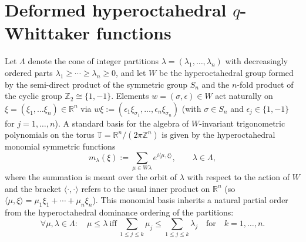 \documentclass[reqno]{amsart}
\theoremstyle{remark}
\numberwithin{equation}{section}
\begin{document}
 
 
 
\section{Deformed hyperoctahedral $q$-Whittaker functions}\label{sec3}
Let  $\Lambda$ denote the cone of integer partitions $\lambda=(\lambda_1,\ldots ,\lambda_n)$  with
decreasingly ordered parts $\lambda_1\geq\cdots\geq\lambda_n\geq 0$, and let
$W$ be the hyperoctahedral group formed by the semi-direct product of the symmetric group $S_n$ and the
$n$-fold product of the cyclic group $\mathbb{Z}_2\cong \{1,-1\}$. 
Elements $w=(\sigma,\epsilon)\in W$ act naturally on $\xi=(\xi_1,\ldots\xi_n)\in \mathbb{R}^n$ via $w\xi:=(\epsilon_1 \xi_{\sigma_1},\ldots ,\epsilon_n \xi_{\sigma_n})$ (with $\sigma\in S_n$ and $\epsilon_j\in \{1,-1\}$ for $j=1,\ldots ,n$).
A standard basis for
the algebra of $W$-invariant trigonometric polynomials on the torus $\mathbb{T}=\mathbb{R}^n/(2\pi\mathbb{Z}^n)$ is given by
the
hyperoctahedral monomial symmetric functions
\begin{equation}
m_\lambda(\xi):=\sum_{\mu\in W\lambda} e^{i\langle \mu ,\xi\rangle},\qquad \lambda\in\Lambda,
\end{equation}
where the summation is meant over the orbit of $\lambda$ with respect to the action of $W$ and the bracket $\langle\cdot ,\cdot \rangle$ refers to the usual inner product on $\mathbb{R}^n$ (so $\langle \mu ,\xi\rangle =\mu_1\xi_1+\cdots +\mu_n\xi_n$). This monomial basis inherits a natural partial order from the
hyperoctahedral dominance ordering of the partitions:
\begin{equation}\label{porder}
\forall \mu,\lambda\in\Lambda:\quad \mu\leq \lambda \ \text{iff}\
\sum_{1\leq j\leq k} \mu_j \leq \sum_{1\leq j\leq k} \lambda_j \quad\text{for}\quad k=1,\ldots ,n.
\end{equation}
\end{document}
